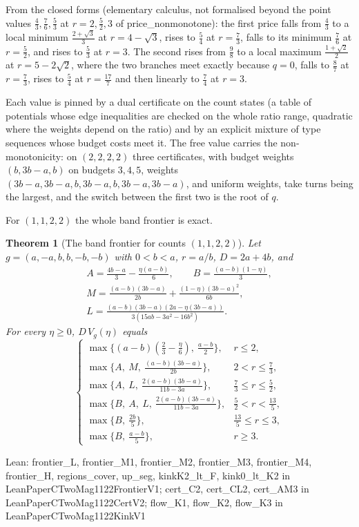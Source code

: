 \documentclass[conference]{IEEEtran}
\newtheorem{theorem}{Theorem}
\theoremstyle{definition}
\newcommand{\lean}[1]{\textsf{\footnotesize #1}}
\newcommand{\leanbox}[1]{%
  \par\vspace{2pt}\noindent
  {\raggedright\footnotesize\textsf{Lean: #1}\par}\vspace{2pt}}
\begin{document}
From the closed forms (elementary calculus, not formalised beyond the point values
$\frac43,\frac76,\frac53$ at $r=2,\frac52,3$ of \lean{price\_nonmonotone}): the first price falls from
$\frac43$ to a local minimum $\frac{2+\sqrt3}3$ at $r=4-\sqrt3$, rises to $\frac54$ at $r=\frac73$, falls to
its minimum $\frac76$ at $r=\frac52$, and rises to $\frac53$ at $r=3$. The second rises from $\frac98$ to
a local maximum $\frac{1+\sqrt2}2$ at $r=5-2\sqrt2$, where the two branches meet exactly because
$q=0$, falls to $\frac87$ at $r=\frac73$, rises to $\frac54$ at $r=\frac{17}7$ and then linearly to
$\frac74$ at $r=3$.

Each value is pinned by a dual certificate on the count states (a table of potentials whose edge
inequalities are checked on the whole ratio range, quadratic where the weights depend on the
ratio) and by an explicit mixture of type sequences whose budget costs meet it. The free value
carries the non-monotonicity: on $(2,2,2,2)$ three certificates, with budget weights
$(b,3b-a,b)$ on budgets $3,4,5$, weights $(3b-a,3b-a,b,3b-a,b,3b-a,3b-a)$, and uniform weights,
take turns being the largest, and the switch between the first two is the root of $q$.

For $(1,1,2,2)$ the whole band frontier is exact.

\begin{theorem}[The band frontier for counts $(1,1,2,2)$]
\label{thm:twomag1122}
Let $g=(a,-a,b,b,-b,-b)$ with $0<b<a$, $r=a/b$, $D=2a+4b$, and
\[
\begin{gathered}
A=\tfrac{4b-a}3-\tfrac{\eta(a-b)}6,\qquad B=\tfrac{(a-b)(1-\eta)}3,\\
M=\tfrac{(a-b)(3b-a)}{2b}+\tfrac{(1-\eta)(3b-a)^2}{6b},\\
L=\tfrac{(a-b)(3b-a)(2a-\eta(3b-a))}{3(15ab-3a^2-16b^2)}.
\end{gathered}
\]
For every $\eta\ge0$, $D\,V_g(\eta)$ equals
\[
\begin{cases}
\max\{(a-b)(\frac23-\frac\eta6),\ \frac{a-b}2\}, & r\le2,\\[2pt]
\max\{A,\ M,\ \frac{(a-b)(3b-a)}{2b}\}, & 2<r\le\frac73,\\[2pt]
\max\{A,\ L,\ \frac{2(a-b)(3b-a)}{11b-3a}\}, & \frac73\le r\le\frac52,\\[2pt]
\max\{B,\ A,\ L,\ \frac{2(a-b)(3b-a)}{11b-3a}\}, & \frac52<r<\frac{13}5,\\[2pt]
\max\{B,\ \frac{2b}5\}, & \frac{13}5\le r\le3,\\[2pt]
\max\{B,\ \frac{a-b}5\}, & r\ge3.
\end{cases}
\]
\end{theorem}
\leanbox{\lean{frontier\_L}, \lean{frontier\_M1}, \lean{frontier\_M2}, \lean{frontier\_M3},
\lean{frontier\_M4}, \lean{frontier\_H}, \lean{regions\_cover}, \lean{up\_seg}, \lean{kinkK2\_lt\_F},
\lean{kink0\_lt\_K2} in \lean{LeanPaperCTwoMag1122FrontierV1}; \lean{cert\_C2}, \lean{cert\_CL2},
\lean{cert\_AM3} in \lean{LeanPaperCTwoMag1122CertV2}; \lean{flow\_K1}, \lean{flow\_K2},
\lean{flow\_K3} in \lean{LeanPaperCTwoMag1122KinkV1}}
\end{document}
